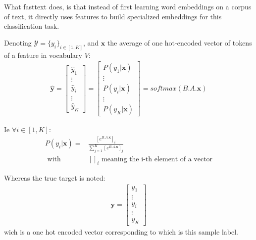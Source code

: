 What fasttext does, is that instead of first learning word embeddings on a corpus of text, it directly uses features to build specialized embeddings for this classification task.

Denoting $\mathcal{Y} = \{y_i\}_{i \in [1, K]}$, and $\mathbf{x}$ the average of one hot-encoded vector of tokens of a feature in vocabulary $V$:
\begin{align}
 \mathbf{\hat y} 
 = 
	\begin{bmatrix} 
		\hat y_1 \\
		\vdots \\
		\hat y_i\\
		\vdots \\
		\hat y_K
	\end{bmatrix} 
 =	\begin{bmatrix} 
		P(y_1 | \mathbf{x}) \\
		\vdots \\
		P(y_i | \mathbf{x})\\
		\vdots \\
		P(y_K | \mathbf{x})
	\end{bmatrix} = 
	softmax(B.A.\mathbf{x})
\end{align}

Ie $\forall i \in [1, K]$:
\begin{align}
 P(y_i | \mathbf{x})= 
 	&\frac{  [e^{B.A.\mathbf{x}}]_i}
 	{\sum_{j=1}^{K} [e^{B.A.\mathbf{x}}]_j} \\
 	\text{      with}& []_i \text{ meaning the i-th element of a vector}
\end{align}


Whereas the true target is noted:
\begin{align}
 \mathbf{y} = 
	\begin{bmatrix} 
		y_1 \\
		\vdots \\
		y_i \\
		\vdots \\
		y_K
	\end{bmatrix} 
\end{align}
wich is a one hot encoded vector corresponding to which is this sample label.



